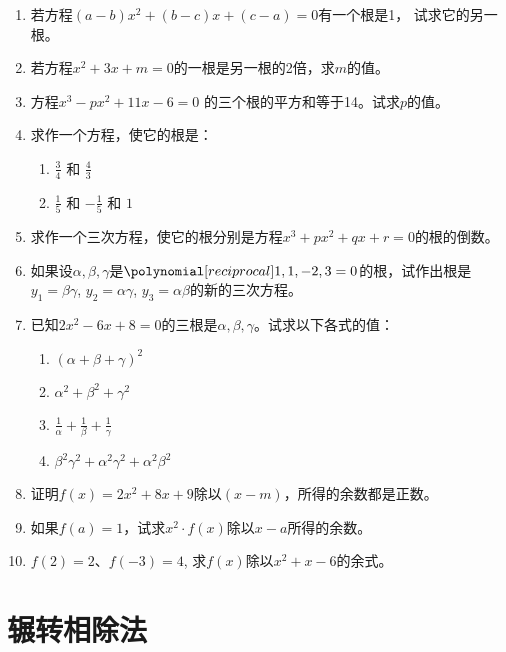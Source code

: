 \begin{enumerate}
\item 若方程$(a-b)x^2+(b-c)x+(c-a)=0$有一个根是1，
试求它的另一根。
\item 若方程$x^2+3x+m=0$的一根是另一根的2倍，求$m$的值。
\item 方程$x^3-px^2+11x-6=0$ 的三个根的平方和等于14。试求$p$的值。
\item 求作一个方程，使它的根是：
\begin{multicols}{2}
    \begin{enumerate}
    \item $\frac{3}{4}$ 和 $\frac{4}{3}$
    \item $\frac{1}{5}$ 和 $-\frac{1}{5}$ 和 $1$
\end{enumerate}
\end{multicols}

\item 求作一个三次方程，使它的根分别是方程$x^3+px^2+qx+r=0$的根的倒数。

\item 如果设$\alpha,\beta,
\gamma$是$\poly{1,1,-2,3}=0$的根，试作出根是
$y_1=\beta\gamma$, $y_2=\alpha\gamma$, $y_3=\alpha\beta$的新的三次方程。

\item 已知$2x^2-6x+8=0$的三根是$\alpha,\beta,
\gamma$。试求以下各式的值：
\begin{multicols}{2}
    \begin{enumerate}
    \item $(\alpha+\beta+\gamma)^2$ 
    \item $\alpha^2+\beta^2+\gamma^2$ 
    \item $\frac{1}{\alpha}+\frac{1}{\beta}+\frac{1}{\gamma}$
    \item $\beta^2\gamma^2+\alpha^2\gamma^2+\alpha^2\beta^2$
\end{enumerate}
\end{multicols}

\item 证明$f(x)=2x^2+8x+9$除以$(x-m)$，所得的余数都是正数。

\item 如果$f(a)=1$，试求$x^2\cdot f(x)$除以$x-a$所得的余数。

\item $f(2)=2$、$f(-3)=4$, 求$f(x)$除以$x^2+x-6$的余式。

\end{enumerate}


\section{辗转相除法}
